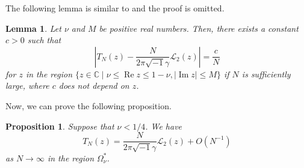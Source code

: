\documentclass[a4paper,dvipdfmx]{amsart}
\theoremstyle{plain}
\newtheorem{lem}[thm]{Lemma}
\newtheorem{prop}[thm]{Proposition}
\theoremstyle{definition}
\theoremstyle{remark}
\newcommand{\C}{\mathbb{C}}
\renewcommand{\L}{\mathcal{L}}
\renewcommand{\Re}{\operatorname{Re}}
\renewcommand{\Im}{\operatorname{Im}}
\renewcommand{\i}{\sqrt{-1}}
\numberwithin{equation}{section}
\begin{document}
The following lemma is similar to \cite[Lemma~2.4]{Murakami:CANJM2023} and the proof is omitted.
\begin{lem}\label{lem:TN_L2}
Let $\nu$ and $M$ be positive real numbers.
Then, there exists a constant $c>0$ such that
\begin{equation*}
  \left|
    T_{N}(z)-\frac{N}{2\pi\i\gamma}\L_2(z)
  \right|
  =
  \frac{c}{N}
\end{equation*}
for $z$ in the region $\{z\in\C\mid\nu\le\Re{z}\le1-\nu,|\Im{z}|\le M\}$ if $N$ is sufficiently large, where $c$ does not depend on $z$.
\end{lem}
\par
Now, we can prove the following proposition.
\begin{prop}\label{prop:TN_L2}
Suppose that $\nu<1/4$.
We have
\begin{equation*}
  T_{N}(z)
  =
  \frac{N}{2\pi\i\gamma}\L_2(z)
  +
  O(N^{-1})
\end{equation*}
as $N\to\infty$ in the region $\Omega^{\ast}_{\nu}$.
\end{prop}
\end{document}
